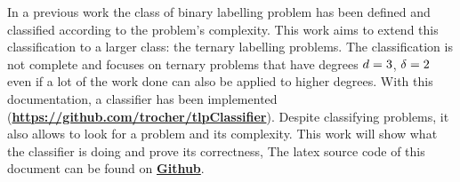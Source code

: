In a previous work \cite{1} the class of binary labelling problem has been defined and classified according to the problem's complexity. This work aims to extend this classification to a larger class: the ternary labelling problems. The classification is not complete and focuses on ternary problems that have degrees $d = 3$, $\delta = 2$ even if a lot of the work done can also be applied to higher degrees. With this documentation, a classifier has been implemented (\hyperlink{https://github.com/trocher/tlpClassifier}{\textbf{https://github.com/trocher/tlpClassifier}}). Despite classifying problems, it also allows to look for a problem and its complexity. This work will show what the classifier is doing and prove its correctness, The latex source code of this document can be found on \hyperlink{https://github.com/trocher/tlpDoc}{\textbf{Github}}.